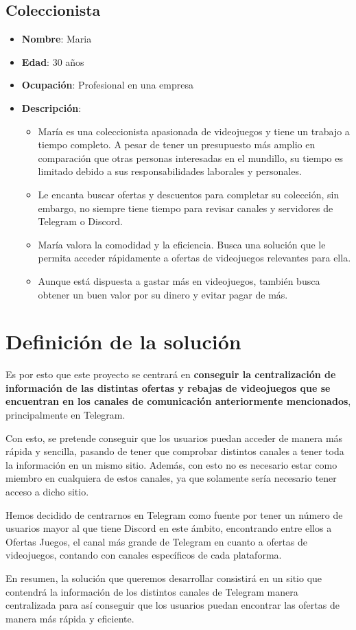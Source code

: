 \subsection{Coleccionista}

\begin{itemize}
    \item \textbf{Nombre}: Maria
    \item \textbf{Edad}: 30 años
    \item \textbf{Ocupación}: Profesional en una empresa
    \item \textbf{Descripción}:
    \begin{itemize}
        \item María es una coleccionista apasionada de videojuegos y tiene un 
        trabajo a tiempo completo. A pesar de tener un presupuesto más amplio en 
        comparación que otras personas interesadas en el mundillo, su tiempo es 
        limitado debido a sus responsabilidades laborales y personales.
        \item Le encanta buscar ofertas y descuentos para completar su colección, 
        sin embargo, no siempre tiene tiempo para revisar canales y servidores de 
        Telegram o Discord.
        \item María valora la comodidad y la eficiencia. Busca una solución que le 
        permita acceder rápidamente a ofertas de videojuegos relevantes para ella.
        \item Aunque está dispuesta a gastar más en videojuegos, también busca 
        obtener un buen valor por su dinero y evitar pagar de más.
    \end{itemize}
\end{itemize}

\section{Definición de la solución}

Es por esto que este proyecto se centrará en \textbf{conseguir la centralización de 
información de las distintas ofertas y rebajas de videojuegos que se encuentran en 
los canales de comunicación anteriormente mencionados}, principalmente en Telegram.

Con esto, se pretende conseguir que los usuarios puedan acceder de manera más 
rápida y sencilla, pasando de tener que comprobar distintos canales a tener toda la 
información en un mismo sitio. Además, con esto no es necesario estar como miembro 
en cualquiera de estos canales, ya que solamente sería necesario tener acceso a 
dicho sitio.

Hemos decidido de centrarnos en Telegram como fuente por tener un número de 
usuarios mayor al que tiene Discord en este ámbito, encontrando entre ellos a 
Ofertas Juegos, el canal más grande de Telegram en cuanto a ofertas de videojuegos, 
contando con canales específicos de cada plataforma.

En resumen, la solución que queremos desarrollar consistirá en un sitio que 
contendrá la información de los distintos canales de Telegram manera centralizada 
para así conseguir que los usuarios puedan encontrar las ofertas de manera más 
rápida y eficiente.
